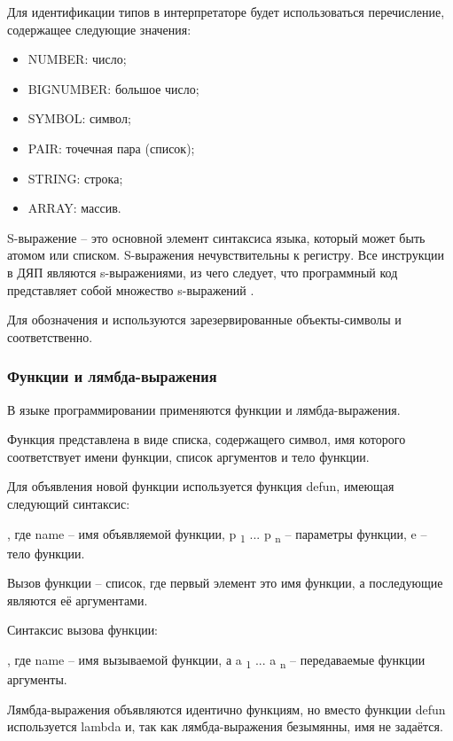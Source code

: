 Для идентификации типов в интерпретаторе будет использоваться перечисление, содержащее следующие значения:
\begin{itemize}
	\item NUMBER: число;
	\item BIGNUMBER: большое число;
	\item SYMBOL: символ;
	\item PAIR: точечная пара (список);
	\item STRING: строка;
	\item ARRAY: массив.
\end{itemize}

S-выражение -- это основной элемент синтаксиса языка, который может быть атомом или списком. S-выражения нечувствительны к регистру. Все инструкции в ДЯП являются s-выражениями, из чего следует, что программный код представляет собой множество s-выражений \cite{e10}.

Для обозначения  и  используются зарезервированные объекты-символы  и  соответственно.

\subsubsection{Функции и лямбда-выражения}

В языке программировании применяются функции и лямбда-выражения.

Функция представлена в виде списка, содержащего символ, имя которого соответствует имени функции, список аргументов и тело функции.

Для объявления новой функции используется функция defun, имеющая следующий синтаксис:

, где name -- имя объявляемой функции, p \textsubscript 1 ... p \textsubscript n -- параметры функции, e -- тело функции.

Вызов функции -- список, где первый элемент это имя функции, а последующие являются её аргументами.

Синтаксис вызова функции:

, где name -- имя вызываемой функции, а a \textsubscript 1 ... a \textsubscript n -- передаваемые функции аргументы.

Лямбда-выражения объявляются идентично функциям, но вместо функции defun используется lambda и, так как лямбда-выражения безымянны, имя не задаётся.

